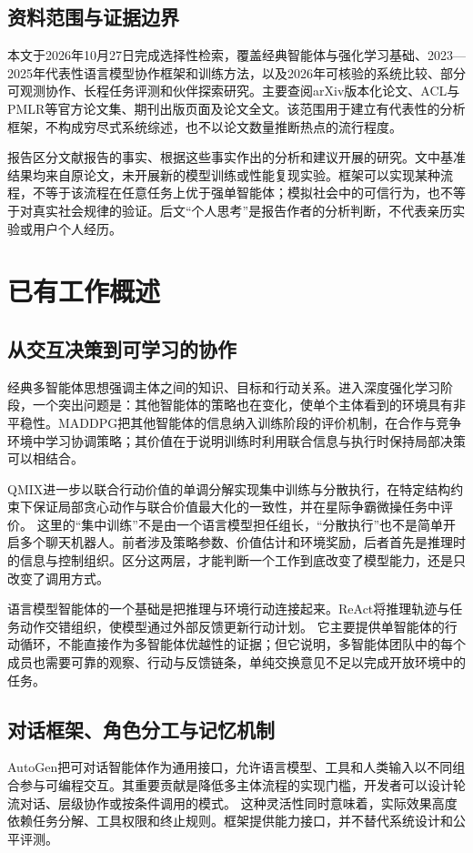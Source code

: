 \documentclass[UTF8,a4paper,fontset=fandol,zihao=5,openany]{ctexrep}
\begin{document}
\section{资料范围与证据边界}
本文于2026年10月27日完成选择性检索，覆盖经典智能体与强化学习基础、2023—2025年代表性语言模型协作框架和训练方法，以及2026年可核验的系统比较、部分可观测协作、长程任务评测和伙伴探索研究。主要查阅arXiv版本化论文、ACL与PMLR等官方论文集、期刊出版页面及论文全文。该范围用于建立有代表性的分析框架，不构成穷尽式系统综述，也不以论文数量推断热点的流行程度。

报告区分文献报告的事实、根据这些事实作出的分析和建议开展的研究。文中基准结果均来自原论文，未开展新的模型训练或性能复现实验。框架可以实现某种流程，不等于该流程在任意任务上优于强单智能体；模拟社会中的可信行为，也不等于对真实社会规律的验证。后文“个人思考”是报告作者的分析判断，不代表亲历实验或用户个人经历。


\chapter{已有工作概述}

\section{从交互决策到可学习的协作}
经典多智能体思想强调主体之间的知识、目标和行动关系。进入深度强化学习阶段，一个突出问题是：其他智能体的策略也在变化，使单个主体看到的环境具有非平稳性。MADDPG把其他智能体的信息纳入训练阶段的评价机制，在合作与竞争环境中学习协调策略；其价值在于说明训练时利用联合信息与执行时保持局部决策可以相结合。\cite{maddpg}

QMIX进一步以联合行动价值的单调分解实现集中训练与分散执行，在特定结构约束下保证局部贪心动作与联合价值最大化的一致性，并在星际争霸微操任务中评价。\cite{qmix} 这里的“集中训练”不是由一个语言模型担任组长，“分散执行”也不是简单开启多个聊天机器人。前者涉及策略参数、价值估计和环境奖励，后者首先是推理时的信息与控制组织。区分这两层，才能判断一个工作到底改变了模型能力，还是只改变了调用方式。

语言模型智能体的一个基础是把推理与环境行动连接起来。ReAct将推理轨迹与任务动作交错组织，使模型通过外部反馈更新行动计划。\cite{react} 它主要提供单智能体的行动循环，不能直接作为多智能体优越性的证据；但它说明，多智能体团队中的每个成员也需要可靠的观察、行动与反馈链条，单纯交换意见不足以完成开放环境中的任务。


\section{对话框架、角色分工与记忆机制}
AutoGen把可对话智能体作为通用接口，允许语言模型、工具和人类输入以不同组合参与可编程交互。其重要贡献是降低多主体流程的实现门槛，开发者可以设计轮流对话、层级协作或按条件调用的模式。\cite{autogen} 这种灵活性同时意味着，实际效果高度依赖任务分解、工具权限和终止规则。框架提供能力接口，并不替代系统设计和公平评测。
\end{document}
